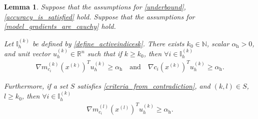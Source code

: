 \documentclass{article}
\newtheorem{lemma}[theorem]{Lemma}
\theoremstyle{case}
\numberwithin{theorem}{subsection}
\newcommand{\gmcik}{{\nabla m_{c_i}^{(k)}\left(\xk\right)}}
\newcommand{\gmcil}{{\nabla m_{c_i}^{(l)}\left(\xl\right)}}
\newcommand{\naturals}{\mathbb N}
\newcommand{\Rn}{\mathbb R^n}
\newcommand{\xk}{x^{(k)}}
\newcommand{\xl}{{x^{(l)}}}
\newcommand{\activeindicesk}{{ \mathbb I_h^{(k)} }}
\newcommand{\minactivealpha}{{ \alpha_{\textrm{h}} }}
\newcommand{\activedirk}{{ u_{h}^{(k)} }}
\begin{document}
\begin{lemma}
\label{yet_another_bound_on_a_u}
Suppose that the assumptions for \cref{underbound}, \cref{accuracy_is_satisfied} hold.
Suppose that the assumptions for \cref{model_gradients_are_cauchy} hold.

Let $\activeindicesk$ be defined by \cref{define_activeindicesk}.
There exists $k_0 \in \naturals$, scalar $\minactivealpha > 0$, and unit vector $\activedirk \in \Rn$ such that if 
$k \ge k_0$, then $\forall i \in \activeindicesk$
\begin{align*}
\gmcik^T \activedirk \ge \minactivealpha
\quad \textrm{and} \quad
\nabla c_i\left(\xk\right)^T \activedirk \ge \minactivealpha.
\end{align*}

Furthermore, if a set $S$ satisfies \cref{criteria_from_contradiction}, and $(k, l) \in S$, $l \ge k_0$, then $\forall i \in \activeindicesk$
\begin{align*}
\gmcil^T \activedirk \ge \minactivealpha.
\end{align*}
\end{lemma}
\end{document}
